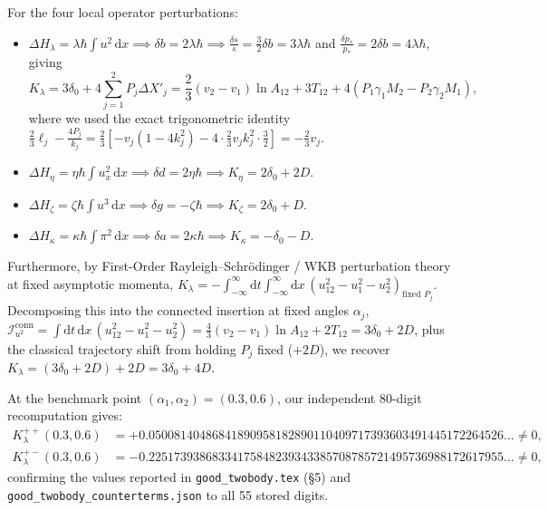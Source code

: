 \documentclass[11pt,a4paper]{article}
\newcommand{\dd}{\mathrm{d}}
\begin{document}
For the four local operator perturbations:
\begin{itemize}
\item $\Delta H_\lambda = \lambda\hbar\int u^2\,\dd x \implies \delta b = 2\lambda\hbar \implies \frac{\delta s}{s} = \frac{3}{2}\delta b = 3\lambda\hbar$ and $\frac{\delta p_*}{p_*} = 2\delta b = 4\lambda\hbar$, giving
\begin{equation}
K_\lambda = 3\delta_0 + 4\sum_{j=1}^2 P_j \Delta X'_j = \frac{2}{3}(v_2 - v_1)\ln A_{12} + 3T_{12} + 4(P_1\gamma_1 M_2 - P_2\gamma_2 M_1),
\label{eq:Klambda}
\end{equation}
where we used the exact trigonometric identity $\frac{2}{3}\ell_j - \frac{4P_j}{k_j} = \frac{2}{3}\left[-v_j(1-4k_j^2) - 4\cdot\frac{2}{3}v_j k_j^2 \cdot \frac{3}{2}\right] = -\frac{2}{3}v_j$.
\item $\Delta H_\eta = \eta\hbar\int u_x^2\,\dd x \implies \delta d = 2\eta\hbar \implies K_\eta = 2\delta_0 + 2D$.
\item $\Delta H_\zeta = \zeta\hbar\int u^3\,\dd x \implies \delta g = -\zeta\hbar \implies K_\zeta = 2\delta_0 + D$.
\item $\Delta H_\kappa = \kappa\hbar\int \pi^2\,\dd x \implies \delta a = 2\kappa\hbar \implies K_\kappa = -\delta_0 - D$.
\end{itemize}
Furthermore, by First-Order Rayleigh--Schr\"odinger / WKB perturbation theory at fixed asymptotic momenta, $K_\lambda = -\int_{-\infty}^\infty \dd t \int_{-\infty}^\infty \dd x\,(u_{12}^2 - u_1^2 - u_2^2)_{\text{fixed }P_j}$. Decomposing this into the connected insertion at fixed angles $\alpha_j$, $\mathcal{I}_{u^2}^{\mathrm{conn}} = \int \dd t\,\dd x\,(u_{12}^2 - u_1^2 - u_2^2) = \frac{4}{3}(v_2-v_1)\ln A_{12} + 2T_{12} = 3\delta_0 + 2D$, plus the classical trajectory shift from holding $P_j$ fixed ($+2D$), we recover $K_\lambda = (3\delta_0 + 2D) + 2D = 3\delta_0 + 4D$.

At the benchmark point $(\alpha_1,\alpha_2) = (0.3, 0.6)$, our independent 80-digit recomputation gives:
\begin{equation}
\begin{aligned}
K_\lambda^{++}(0.3,0.6) &= +0.05008140486841890958182890110409717393603491445172264526\dots \neq 0, \\
K_\lambda^{+-}(0.3,0.6) &= -0.22517393868334175848239343385708785721495736988172617955\dots \neq 0,
\end{aligned}
\end{equation}
confirming the values reported in \texttt{good\_twobody.tex} (\S5) and \texttt{good\_twobody\_counterterms.json} to all 55 stored digits.
\end{document}
